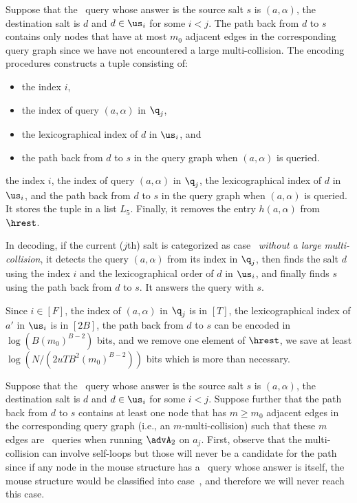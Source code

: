  Suppose that the \new\ query whose answer is the source salt $s$ is $(a,\alpha)$, the destination salt is $d$ and  $d\in \us_i$ for some $i<j$. The path back from $d$ to $s$ contains only nodes that have at most $m_0$ adjacent edges in the corresponding query graph since we have not encountered a large multi-collision.
The encoding procedures constructs a tuple consisting of\ifnum{}:
\begin{itemize}
  \item the index $i$,
  \item the index of query $(a,\alpha)$ in $\q_j$,
  \item the lexicographical index of $d$ in $\us_i$, and 
  \item the path back from $d$ to $s$ in the query graph when $(a,\alpha)$ is queried.
\end{itemize}
\else
the index $i$,
  the index of query $(a,\alpha)$ in $\q_j$, the lexicographical index of $d$ in $\us_i$, and the path back from $d$ to $s$ in the query graph when $(a,\alpha)$ is queried.
\fi
 It stores the tuple in a list $L_5$. Finally, it removes the entry $h(a,\alpha)$ from $\hrest$.

In decoding, if  the current ($j$th) salt is categorized as case~ \emph{without a large multi-collision}, it  detects the query $(a,\alpha)$ from its index in $\q_j$, then finds the salt $d$ using the index $i$ and the lexicographical order of $d$ in $\us_i$, and finally finds $s$ using the path back from $d$ to $s$. It answers the query with  $s$.

Since $i\in [F]$, the index of $(a,\alpha)$ in $\q_j$ is in $[T]$, the lexicographical index of $a'$ in $\us_i$ is in $[2B]$, the path back from $d$ to $s$ can be encoded in $\log (B(m_0)^{B-2})$ bits, and we remove one element of $\hrest$, we save at least $\log (N/(2uTB^2(m_0)^{B-2}))$ bits which is more than necessary.





Suppose that the \new\ query whose answer is the source salt $s$ is $(a,\alpha)$, the destination salt is $d$ and  $d\in \us_i$ for some $i<j$. Suppose further that the path back from $d$ to $s$ contains at least one node that has $m \ge m_0$ adjacent edges in the corresponding query graph (i.e., an $m$-multi-collision) such that these $m$ edges are \urep\ queries when running $\advA_2$ on $a_j$.  First, observe that the multi-collision  can involve self-loops but those will never be a candidate for the path
since if any node in the mouse structure has a \urep\ query whose answer is itself, the mouse structure would be classified into case~, and therefore we will never reach this case.

